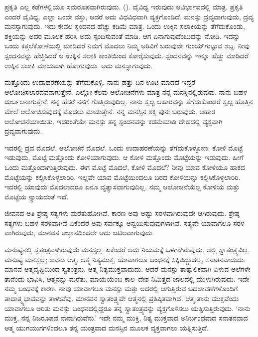 ಪ್ರಕೃತಿ ಎಲ್ಲ ಕಡೆಗಳಲ್ಲಿಯೂ ಸಮರೂಪವಾಗಿರುವುದು. (). ವೈವಿಧ್ಯ ಇರುವುದು ಆವಿರ್ಭಾವದಲ್ಲಿ ಮಾತ್ರ. ಪ್ರಕೃತಿ ಎಂದರೆ ವೈವಿಧ್ಯ. ಎಲ್ಲಾ ಒಂದೇ ವಸ್ತು, ಆದರೆ ಅದು ವಿಧವಿಧವಾಗಿ ವ್ಯಕ್ತಗೊಂಡಿದೆ. ಮನಸ್ಸು ದ್ರವ್ಯವಾಗುವುದು, ದ್ರವ್ಯ ಮನಸ್ಸಾಗುವುದು. ಇದು ಕೇವಲ ಸ್ಪಂದನದ ಹೆಚ್ಚು ಕಡಿಮೆ ಮಾತ್ರ. ಒಂದು ಉಕ್ಕಿನ ಸಲಾಕಿಯನ್ನು ತೆಗೆದುಕೊಂಡು, ಶಕ್ತಿಯನ್ನು ಅದರ ಮೂಲಕ ಹರಿಸಿ ಅದು ಸ್ಪಂದಿಸುವಂತೆ ಮಾಡಿ. ಆಗ ಏನಾಗುವುದೆಂಬುದನ್ನು ನೋಡಿ. ಇದನ್ನು ಒಂದು ಕತ್ತಲೆಕೋಣೆಯಲ್ಲಿ ಮಾಡಿದರೆ ನಿಮಗೆ ಮೊದಲು ನಿಮ್ಮ ಅರಿವಿಗೆ ಬರುವುದೇ ಗುಂಯ್‌ಗುಟ್ಟುವ ಶಬ್ದ. ನೀವು ಸ್ಪಂದನವನ್ನು ಹೆಚ್ಚಿಸಿದರೆ ಆ ಉಕ್ಕಿನ ಸಲಾಕಿ ಕಾಂತಿಯಿಂದ ಕೋರೈಸುವುದು. ಸ್ಪಂದನವನ್ನು ಇನ್ನೂ ಹೆಚ್ಚು ಮಾಡಿದರೆ ಉಕ್ಕಿನ ಸಲಾಕಿ ಮಾಯವಾಗಿ ಹೋಗುವುದು. ಅದು ಮನಸ್ಸಾಗುವುದು.

ಮತ್ತೊಂದು ಉದಾಹರಣೆಯನ್ನು ತೆಗೆದುಕೊಳ್ಳಿ. ನಾನು ಹತ್ತು ದಿನ ಊಟ ಮಾಡದೆ ಇದ್ದರೆ ಆಲೋಚಿಸಲಾರದವನಾಗುತ್ತೇನೆ. ಎಲ್ಲೋ ಕೆಲವು ಆಲೋಚನೆಗಳು ಮಾತ್ರ ನನ್ನ ಮನಸ್ಸಿನಲ್ಲಿರುವುವು. ನಾನು ಬಹಳ ದುರ್ಬಲನಾಗುತ್ತೇನೆ. ನನ್ನ ಹೆಸರೆ ನನಗೆ ಗೊತ್ತಿರುವುದಿಲ್ಲ. ನಾನು ಸ್ವಲ್ಪ ಆಹಾರವನ್ನು ತೆಗೆದುಕೊಂಡರೆ ಸ್ವಲ್ಪ ಹೊತ್ತಿನ ಮೇಲೆ ಆಲೋಚಿಸುವುದಕ್ಕೆ ಮೊದಲು ಮಾಡುತ್ತೇನೆ. ನನ್ನ ಮನಸ್ಸಿನ ಶಕ್ತಿ ಪುನಃ ಬರುವುದು. ಆಹಾರ ಆಲೋಚನೆಯಾಯಿತು. ಇದರಂತೆಯೇ ಮನಸ್ಸು ತನ್ನ ಸ್ಪಂದನವನ್ನು ಕಡಮೆಮಾಡಿ ದೇಹದಲ್ಲಿ ವ್ಯಕ್ತವಾಗಿ ದ್ರವ್ಯವಾಗುವುದು.

ಇದರಲ್ಲಿ ದ್ರವ ಮೊದಲೆ, ಆಲೋಚನೆ ಮೊದಲೆ. ಒಂದು ಉದಾಹರಣೆಯನ್ನು ತೆಗೆದುಕೊಳ್ಳೋಣ: ಕೋಳಿ ಮೊಟ್ಟೆ ಇಡುವುದು, ಮೊಟ್ಟೆ ಮತ್ತೊಂದು ಕೋಳಿಯಾಗುವುದು. ಆ ಕೋಳಿ ಮತ್ತೊಂದು ಮೊಟ್ಟೆಯನ್ನು ಇಡುವುದು. ಹೀಗೆ ಒಂದು ಮತ್ತೊಂದಾಗುತ್ತಿರುವುದು. ಈಗ ಮೊಟ್ಟೆ ಮೊದಲೆ, ಕೋಳಿ ಮೊದಲೆ? ನೀವು ಯಾವ ಕೋಳಿಯೂ ಹಾಕದ ಮೊಟ್ಟೆಯನ್ನು ಕಲ್ಪಿಸಿಕೊಳ್ಳಲಾರಿರಿ. ಇಲ್ಲವೇ ಯಾವ ಮೊಟ್ಟೆಯಿಂದಲೂ ಬರದ ಕೋಳಿಯನ್ನು ಕಲ್ಪಿಸಿಕೊಳ್ಳಲಾರಿರಿ. ಇದರಲ್ಲಿ ಯಾವುದು ಮೊದಲಾದರೂ ಏನೂ ವ್ಯತ್ಯಾಸವಾಗುವುದಿಲ್ಲ. ನಮ್ಮ ಆಲೋಚನೆಯೆಲ್ಲ ಕೋಳಿಯ ಮತ್ತು ಮೊಟ್ಟೆಯ ನ್ಯಾಯದಂತೆ ಇದೆ.

ಜೀವನದ ಅತಿ ಶ್ರೇಷ್ಠ ಸತ್ಯಗಳು ಮರೆತುಹೋಗಿವೆ. ಕಾರಣ ಅವು ಅಷ್ಟು ಸರಳವಾಗಿರುವುದೇ ಆಗಿರುವುದು. ಶ್ರೇಷ್ಠ ಸತ್ಯಗಳು ಬಹಳ ಸರಳವಾಗಿವೆ ಏಕೆಂದರೆ ಅವು ಸರ್ವಕ್ಕೂ ಅನ್ವಯಿಸುವುವುಗಳಾಗಿವೆ. ಸತ್ಯವೇ ಯಾವಾಗಲೂ ಸರಳ ವಾಗಿರುವುದು, ಮಾನವನ ಅಜ್ಞಾನದಿಂದಲೇ ಅದು ಜಟಿಲವಾಗುವುದು.

ಮನುಷ್ಯನಲ್ಲಿ ಸ್ವತಂತ್ರವಾಗಿರುವುದು ಮನಸ್ಸಲ್ಲ. ಏಕೆಂದರೆ ಅದು ನಿಯಮಕ್ಕೆ ಒಳಗಾಗಿರುವುದು. ಅಲ್ಲಿ ಸ್ವಾತಂತ್ರ್ಯವಿಲ್ಲ. ಮನುಷ್ಯ ಮನಸ್ಸಲ್ಲ; ಅವನು ಆತ್ಮ. ಆತ್ಮ ನಿತ್ಯಮುಕ್ತ, ಯಾವಾಗಲೂ ಬಂಧನಕ್ಕೆ ಸಿಕ್ಕಿಬಿದ್ದುದಲ್ಲ, ಸನಾತನವಾದುದು. ಮಾನವ ಆತ್ಮದೃಷ್ಟಿಯಿಂದ ಸ್ವತಂತ್ರನು. ಆತ್ಮ ನಿತ್ಯಮುಕ್ತವಾದುದು. ಆದರೆ ಮನಸ್ಸು ತಾತ್ಕಾಲಿಕವಾಗಿ ಏಳುವ ಅಲೆಗಳೇ ತಾನೆಂದು ಭಾವಿಸಿ, ಆತ್ಮನನ್ನು ಮರೆತು, ಮಾಯೆಯೆಂಬ ಕಾಲ–ದೇಶ ನಿಮಿತ್ತದ ಜಾಲದಲ್ಲಿ ಮುಳುಗಿರುವುದು. ಇದೇ ನಮ್ಮ ಬಂಧನಕ್ಕೆ ಕಾರಣ. ನಾವು ಯಾವಾಗಲೂ ಮನಸ್ಸು ಮತ್ತು ಅದರಲ್ಲಿ ಆಗುತ್ತಿರುವ ಬದಲಾವಣೆಗಳೊಂದಿಗೆ ತಾದಾತ್ಮ್ಯಭಾವವನ್ನು ತಾಳುವೆವು. ಮಾನವನ ಸ್ವಾತಂತ್ರ್ಯವೇ ಆತ್ಮನಲ್ಲಿ ಪ್ರತಿಷ್ಠಿತವಾಗಿದೆ. ಆತ್ಮ ತಾನು ಮುಕ್ತವೆಂದು ಯಾವಾಗಲೂ ಅರಿತು ಮನಸ್ಸು ಬಂಧನದಲ್ಲಿದ್ದರೂ ತನ್ನ ಸ್ವಾತಂತ್ರ್ಯವನ್ನು ವ್ಯಕ್ತಗೊಳಿಸಲು ಯತ್ನಿಸುತ್ತಿರುವುದು. `ನಾನು ಮುಕ್ತ, ನನ್ನ ನಿಜರೂಪವೆ ನಾನಾಗಿರುವೆನು.' ಇದೇ ನಮ್ಮ ಮುಕ್ತಿ, ನಿತ್ಯ ಮುಕ್ತವಾದ ಅನಿರ್ಬಂಧವಾದ ಸನಾತನವಾದ ಆತ್ಮ ಯುಗಯುಗಗಳಿಂದಲೂ ತನ್ನ ಯಂತ್ರವಾದ ಮನಸ್ಸಿನ ಮೂಲಕ ವ್ಯಕ್ತವಾಗಲು ಯತ್ನಿಸುತ್ತಿದೆ.

